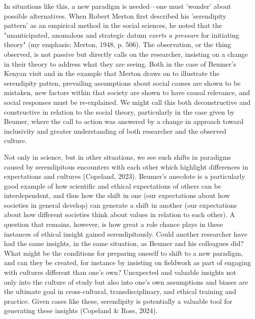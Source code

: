 \documentclass[authordate, empirical]{jote-new-article}
\begin{document}

	In situations like this, a new paradigm is needed—one must 'wonder' about possible alternatives. When Robert Merton first described his 'serendipity pattern' as an empirical method in the social sciences, he noted that the "unanticipated, anomalous and strategic datum \emph{exerts a pressure }for initiating theory" (my emphasis; Merton, 1948, p. 506). The observation, or the thing observed, is not passive but directly calls on the researcher, insisting on a change in their theory to address what they are seeing. Both in the case of Beumer's Kenyan visit and in the example that Merton draws on to illustrate the serendipity patten, prevailing assumptions about social causes are shown to be mistaken, new factors within that society are shown to have causal relevance, and social responses must be re-explained. We might call this both deconstructive and constructive in relation to the social theory, particularly in the case given by Beumer, where the call to action was answered by a change in approach toward inclusivity and greater understanding of both researcher and the observed culture.



	Not only in science, but in other situations, we see such shifts in paradigms caused by serendipitous encounters with each other which highlight differences in expectations and cultures (Copeland, 2023). Beumer's anecdote is a particularly good example of how scientific and ethical expectations of others can be interdependent, and thus how the shift in one (our expectations about how societies in general develop) can generate a shift in another (our expectations about how different societies think about values in relation to each other). A question that remains, however, is how great a role chance plays in these instances of ethical insight gained serendipitously. Could another researcher have had the same insights, in the same situation, as Beumer and his colleagues did? What might be the conditions for preparing oneself to shift to a new paradigm, and can they be created, for instance by insisting on fieldwork as part of engaging with cultures different than one's own? Unexpected and valuable insights not only into the culture of study but also into one's own assumptions and biases are the ultimate goal in cross-cultural, transdisciplinary, and ethical training and practice. Given cases like these, serendipity is potentially a valuable tool for generating these insights (Copeland \& Ross, 2024).
\end{document}

